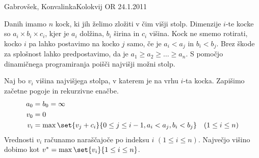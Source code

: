 \begin{naloga}{Gabrovšek, Konvalinka}{Kolokvij OR 24.1.2011}
\begin{vprasanje}
Danih imamo $n$ kock, ki jih želimo zložiti v čim višji stolp.
Dimenzije $i$-te kocke so $a_i \times b_i \times c_i$,
kjer je $a_i$ dolžina, $b_i$ širina in $c_i$ višina.
Kock ne smemo rotirati,
kocko $i$ pa lahko postavimo na kocko $j$ samo,
če je $a_i < a_j$ in $b_i < b_j$.
Brez škode za splošnost lahko predpostavimo,
da je $a_1 \ge a_2 \ge \dots \ge a_n$.
S pomočjo dinamičnega programiranja poišči najvišji možni stolp.
\end{vprasanje}

\begin{odgovor}
Naj bo $v_i$ višina najvišjega stolpa, v katerem je na vrhu $i$-ta kocka.
Zapišimo začetne pogoje in rekurzivne enačbe.
\begin{align*}
a_0 &= b_0 = \infty \\
v_0 &= 0 \\
v_i &= \max\set{v_j + c_i}{0 \le j \le i-1, a_i < a_j, b_i < b_j}
\quad (1 \le i \le n)
\end{align*}
Vrednosti $v_i$ računamo naraščajoče po indeksu $i$ $(1 \le i \le n)$.
Največjo višino dobimo kot $v^* = \max\set{v_i}{1 \le i \le n}$.
\end{odgovor}
\end{naloga}
